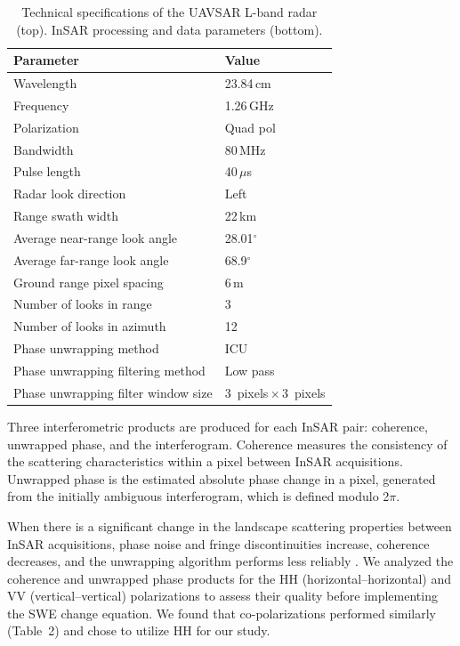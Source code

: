 \begin{table}[t]
\centering
\caption{Technical specifications of the UAVSAR L-band radar (top). InSAR processing and data parameters (bottom).}
\begin{tabular}{ll}
\toprule Parameter & Value \\
\midrule
Wavelength & 23.84\,cm \\
Frequency & 1.26\,GHz \\
Polarization & Quad pol \\
Bandwidth & 80\,MHz \\
Pulse length & 40\,$\mu$s \\
Radar look direction & Left \\
Range swath width & 22\,km \\
Average near-range look angle & 28.01$^{\circ}$\\
Average far-range look angle & 68.9$^{\circ}$\\
\midrule
Ground range pixel spacing & 6\,m \\
Number of looks in range & 3 \\
Number of looks in azimuth & 12 \\
Phase unwrapping method & ICU \\
Phase unwrapping filtering method & Low pass \\
Phase unwrapping filter window size & 3~pixels\,$\times$\,3~pixels \\
\bottomrule
\end{tabular}
\end{table}

Three interferometric products are produced for each InSAR pair: coherence, unwrapped phase, and the interferogram. Coherence measures the consistency of the scattering characteristics within a pixel between InSAR acquisitions. Unwrapped phase is the estimated absolute phase change in a pixel, generated from the initially ambiguous interferogram, which is defined modulo 2$\pi$.

When there is a significant change in the landscape scattering properties between InSAR acquisitions, phase noise and fringe discontinuities increase, coherence decreases, and the unwrapping algorithm performs less reliably \citep{balzterForestMappingMonitoring2001}. We analyzed the coherence and unwrapped phase products for the HH (horizontal--horizontal) and VV (vertical--vertical) polarizations to assess their quality before implementing the SWE change equation. We found that co-polarizations performed similarly (Table~2) and chose to utilize HH for our study.


